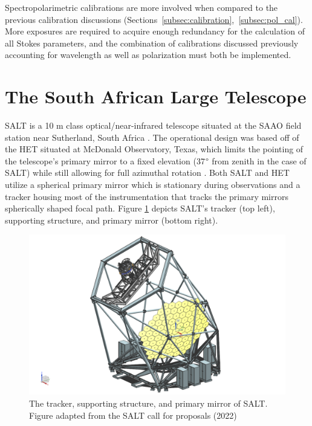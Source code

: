 Spectropolarimetric calibrations are more involved when compared to the previous calibration discussions (Sections~\ref{subsec:calibration},~\ref{subsec:pol_cal}). More exposures are required to acquire enough redundancy for the calculation of all Stokes parameters, and the combination of calibrations discussed previously accounting for wavelength as well as polarization must both be implemented.
\prgph


\section{The South African Large Telescope} %

\gls{SALT} is a 10 m class optical/near-infrared telescope situated at the \gls{SAAO} field station near Sutherland, South Africa \citep{SALT_optical_design}. The operational design was based off of the \gls{HET} situated at McDonald Observatory, Texas, which limits the pointing of the telescope's primary mirror to a fixed elevation (37$\degree$ from zenith in the case of SALT) while still allowing for full azimuthal rotation \citep{HET}. Both SALT and HET utilize a spherical primary mirror which is stationary during observations and a tracker housing most of the instrumentation that tracks the primary mirrors spherically shaped focal path. Figure \ref{fig:SALT_telescope} depicts \gls{SALT}'s tracker (top left), supporting structure, and primary mirror (bottom right).

\begin{figure}[t]
    \centering
    \includegraphics[width = 15cm]{figures/2_SALT_telescope.png}
    \caption{The tracker, supporting structure, and primary mirror of SALT. Figure adapted from the SALT call for proposals (2022)\protect\footnotemark}
    \label{fig:SALT_telescope}
\end{figure}

